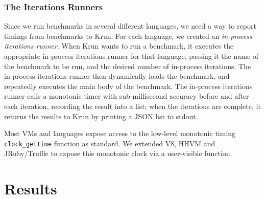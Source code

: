 \documentclass[a4paper,UKenglish]{lipics}
\newcommand{\krun}{Krun\xspace}
\begin{document}
%
%
%


\subsubsection{The Iterations Runners}

Since we run benchmarks in several different languages, we need a way to report
timings from benchmarks to \krun. For each language, we created an
\emph{in-process iterations runner}. When \krun wants to run a benchmark, it executes the
appropriate in-process iterations runner for that language, passing it the name of the
benchmark to be run, and the desired number of in-process iterations. The in-process iterations runner
then dynamically loads the benchmark, and repeatedly executes the main body of
the benchmark. The in-process iterations runner calls a monotonic timer with
sub-millisecond accuracy before and after each iteration, recording the result
into a list; when the iterations are complete, it returns the results
to \krun by printing a JSON list to stdout.

Most VMs and languages expose access to the low-level monotonic timing
\texttt{clock\_gettime} function as standard. We extended V8, HHVM and JRuby/Truffle
to expose this monotonic clock via a user-visible function.


\section{Results}
\label{sec:Results}
\end{document}
